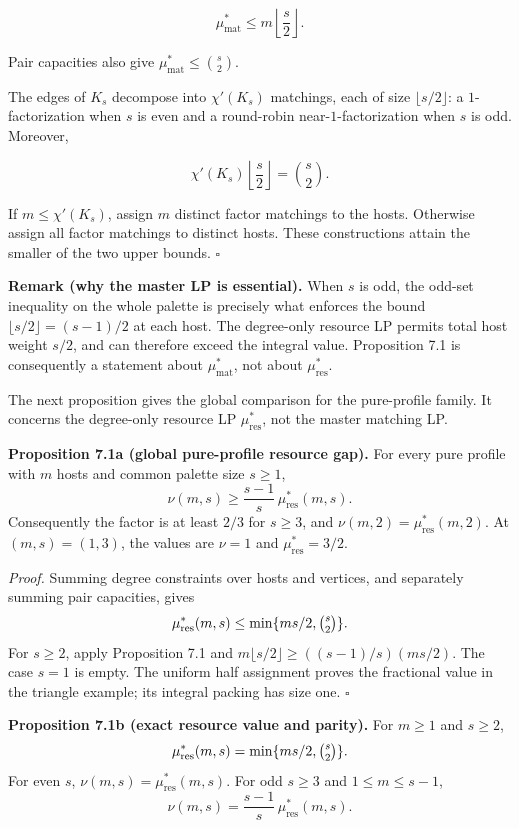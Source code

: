 \documentclass[english,11pt,a4paper]{article}
\begin{document}
\[
\mu^*_{\mathrm{mat}}
\le
m\left\lfloor\frac{s}{2}\right\rfloor.
\]

Pair capacities also give \(\mu^*_{\mathrm{mat}}\le\binom{s}{2}\).

The edges of \(K_s\) decompose into \(\chi'(K_s)\) matchings, each of
size \(\lfloor s/2\rfloor\): a \(1\)-factorization when \(s\) is even
and a round-robin near-\(1\)-factorization when \(s\) is odd. Moreover,

\[
\chi'(K_s)\left\lfloor\frac{s}{2}\right\rfloor
=
\binom{s}{2}.
\]

If \(m\le\chi'(K_s)\), assign \(m\) distinct factor matchings to the
hosts. Otherwise assign all factor matchings to distinct hosts. These
constructions attain the smaller of the two upper bounds. \(\square\)

\textbf{Remark (why the master LP is essential).} When \(s\) is odd, the
odd-set inequality on the whole palette is precisely what enforces the
bound \(\lfloor s/2\rfloor=(s-1)/2\) at each host. The degree-only
resource LP permits total host weight \(s/2\), and can therefore exceed
the integral value. Proposition 7.1 is consequently a statement about
\(\mu^*_{\mathrm{mat}}\), not about \(\mu^*_{\mathrm{res}}\).

The next proposition gives the global comparison for the pure-profile
family. It concerns the degree-only resource LP
\(\mu^*_{\mathrm{res}}\), not the master matching LP.

\textbf{Proposition 7.1a (global pure-profile resource gap).} For every
pure profile with \(m\) hosts and common palette size \(s\ge1\), \[
\nu(m,s)\ge\frac{s-1}{s}\,\mu^*_{\mathrm{res}}(m,s).
\] Consequently the factor is at least \(2/3\) for \(s\ge3\), and
\(\nu(m,2)=\mu^*_{\mathrm{res}}(m,2)\). At \((m,s)=(1,3)\), the values
are \(\nu=1\) and \(\mu^*_{\mathrm{res}}=3/2\).

\emph{Proof.} Summing degree constraints over hosts and vertices, and
separately summing pair capacities, gives \[
\mu^*_{\mathrm{res}}(m,s)\le\min\{ms/2,\tbinom{s}{2}\}.
\] For \(s\ge2\), apply Proposition 7.1 and
\(m\lfloor s/2\rfloor\ge((s-1)/s)(ms/2)\). The case \(s=1\) is empty.
The uniform half assignment proves the fractional value in the triangle
example; its integral packing has size one. \(\square\)

\textbf{Proposition 7.1b (exact resource value and parity).} For
\(m\ge1\) and \(s\ge2\), \[
\mu^*_{\mathrm{res}}(m,s)=\min\{ms/2,\tbinom{s}{2}\}.
\] For even \(s\), \(\nu(m,s)=\mu^*_{\mathrm{res}}(m,s)\). For odd
\(s\ge3\) and \(1\le m\le s-1\), \[
\nu(m,s)=\frac{s-1}{s}\,\mu^*_{\mathrm{res}}(m,s).
\]
\end{document}

